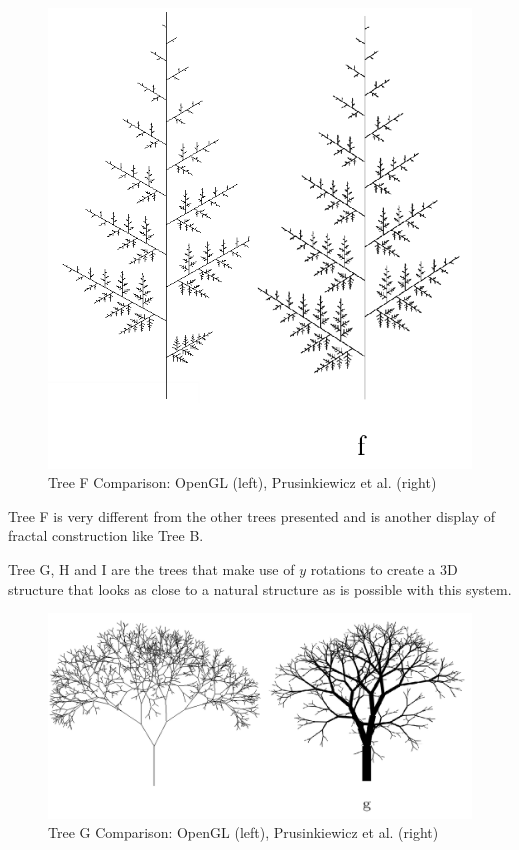 \documentclass[final]{cmpreport}
\begin{document}
\begin{figure}[ht]
    \includegraphics[scale=0.37]{tree-comp-f.png} 
    \centering
    \captionsetup{justification=centering}
    \caption{Tree F Comparison: OpenGL (left), Prusinkiewicz et al. (right)}
    \label{fig:tree-comp-f}
\end{figure}

Tree F is very different from the other trees presented and is another display of fractal 
construction like Tree B.

\pagebreak
Tree G, H and I are the trees that make use of $y$ rotations to create a 3D structure that looks 
as close to a natural structure as is possible with this system. 

\begin{figure}[ht]
    \includegraphics[scale=0.4]{tree-comp-g.png} 
    \centering
    \captionsetup{justification=centering}
    \caption{Tree G Comparison: OpenGL (left), Prusinkiewicz et al. (right)}
    \label{fig:tree-comp-g}
\end{figure}
\end{document}
